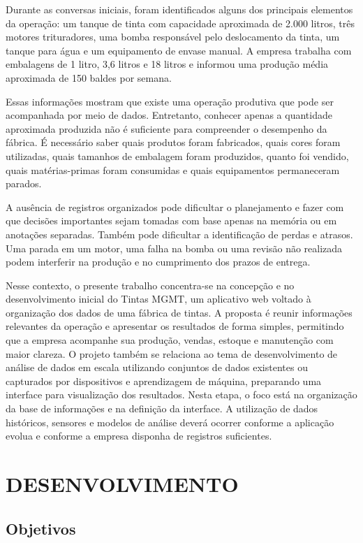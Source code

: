 \documentclass[12pt,a4paper]{article}
\begin{document}
Durante as conversas iniciais, foram identificados alguns dos principais elementos da operação: um tanque de tinta com capacidade aproximada de 2.000 litros, três motores trituradores, uma bomba responsável pelo deslocamento da tinta, um tanque para água e um equipamento de envase manual. A empresa trabalha com embalagens de 1 litro, 3,6 litros e 18 litros e informou uma produção média aproximada de 150 baldes por semana.

Essas informações mostram que existe uma operação produtiva que pode ser acompanhada por meio de dados. Entretanto, conhecer apenas a quantidade aproximada produzida não é suficiente para compreender o desempenho da fábrica. É necessário saber quais produtos foram fabricados, quais cores foram utilizadas, quais tamanhos de embalagem foram produzidos, quanto foi vendido, quais matérias-primas foram consumidas e quais equipamentos permaneceram parados.

A ausência de registros organizados pode dificultar o planejamento e fazer com que decisões importantes sejam tomadas com base apenas na memória ou em anotações separadas. Também pode dificultar a identificação de perdas e atrasos. Uma parada em um motor, uma falha na bomba ou uma revisão não realizada podem interferir na produção e no cumprimento dos prazos de entrega.

Nesse contexto, o presente trabalho concentra-se na concepção e no desenvolvimento inicial do Tintas MGMT, um aplicativo web voltado à organização dos dados de uma fábrica de tintas. A proposta é reunir informações relevantes da operação e apresentar os resultados de forma simples, permitindo que a empresa acompanhe sua produção, vendas, estoque e manutenção com maior clareza.
O projeto também se relaciona ao tema de desenvolvimento de análise de dados em escala utilizando conjuntos de dados existentes ou capturados por dispositivos e aprendizagem de máquina, preparando uma interface para visualização dos resultados. Nesta etapa, o foco está na organização da base de informações e na definição da interface. A utilização de dados históricos, sensores e modelos de análise deverá ocorrer conforme a aplicação evolua e conforme a empresa disponha de registros suficientes.

\newpage
\section{DESENVOLVIMENTO}

\subsection{Objetivos}
\end{document}
